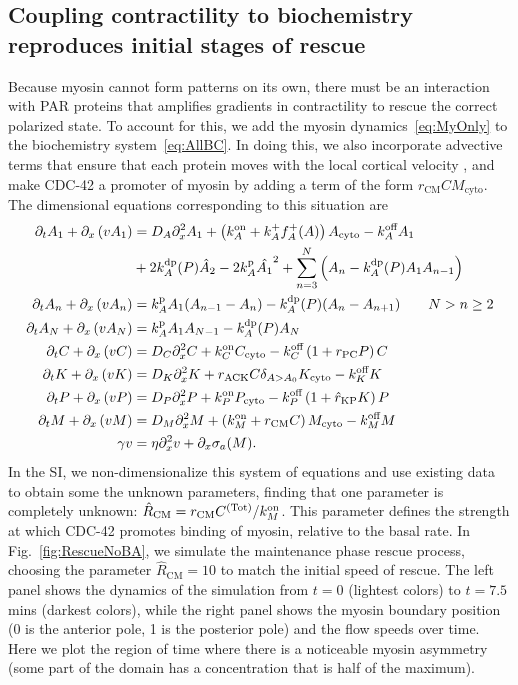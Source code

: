 \documentclass[11pt]{article}
\newcommand{\6}[1]{#1_{\text{6}}}
\newcommand{\3}[1]{#1_{\text{3}}}
\newcommand{\Tot}[1]{#1^\text{(Tot)}}
\newcommand{\My}[1]{#1_M}
\begin{document}
\subsection{Coupling contractility to biochemistry reproduces initial stages of rescue \label{sec:WithMy}}
Because myosin cannot form patterns on its own, there must be an interaction with PAR proteins that amplifies gradients in contractility to rescue the correct polarized state. To account for this, we add the myosin dynamics\ \eqref{eq:MyOnly} to the biochemistry system\ \eqref{eq:AllBC}. In doing this, we also incorporate advective terms that ensure that each protein moves with the local cortical velocity \cite{illukkumbura2023design}, and make CDC-42 a promoter of myosin by adding a term of the form $r_\text{CM}C M_\text{cyto}$. The dimensional equations corresponding to this situation are
\begin{subequations}
\label{eq:Everything}
\begin{align}
\label{eq:P31}
\Dt \MA + \Dx \left( v \MA \right)& = D_A \Dx^2 \MA + \left(\kon_A+k^+_A f^+_A(A) \right)A_\text{cyto}- \koff_A \MA  \\  \nonumber
 &+ 2 \kdp_A(P) \hat{A}_2-2\kp_A \hat{\MA}^2+\sum_{n=3}^N \left(A_n-\kdp_A(P) A_1 A_{n-1}\right)  \\ 
\Dt \PA + \Dx \left(v \PA \right)& =\kp_{A}\MA (A_{n-1}-A_n) -\kdp_A(P)(A_n-A_{n+1})  \qquad N > n \geq 2 \\ 
\label{eq:P33}
\Dt A_N + \Dx \left(v A_N\right)& =\kp_A \MA  A_{N-1}-\kdp_A(P) A_N \\
\label{eq:Ceqn}
\Dt C + \Dx \left(v C\right)& =D_C \Dx^2 {C} +\kon_C C_\text{cyto}  - \koff_C \left(1+r_\text{PC}P\right)C\\
\label{eq:Keqn}
\Dt {K} + \Dx \left(v K\right) &= D_K \Dx^2 {K} + {r}_\text{ACK} {C} \delta_{A > A_0}K_\text{cyto}-\koff_K K \\
\Dt {P} + \Dx \left(v P \right)& =D_P \Dx^2 {P} +\kon_P P_\text{cyto}  - \koff_P \left(1+\hat{r}_\text{KP}{K}\right){P}\\
\Dt M + \Dx \left(v M\right) &= D_M \Dx^2 M +\left(\My{\kon}+r_\text{CM} C\right) M_\text{cyto} - \My{\koff} M \\
\gamma v &= \eta \Dx^2 v + \Dx \sigma_a(M).
\end{align}
\end{subequations}
In the SI, we non-dimensionalize this system of equations and use existing data to obtain some the unknown parameters, finding that one parameter is completely unknown: $\hat R_\text{CM}=r_\text{CM} \Tot{C}/\kon_M$. This parameter defines the strength at which CDC-42 promotes binding of myosin, relative to the basal rate. In Fig.\ \ref{fig:RescueNoBA}, we simulate the maintenance phase rescue process, choosing the parameter $\hat R_\text{CM}=10$ to match the initial speed of rescue. The left panel shows the dynamics of the simulation from $t=0$ (lightest colors) to $t=7.5$ mins (darkest colors), while the right panel shows the myosin boundary position (0 is the anterior pole, 1 is the posterior pole) and the flow speeds over time. Here we plot the region of time where there is a noticeable myosin asymmetry (some part of the domain has a concentration that is half of the maximum).
\end{document}
